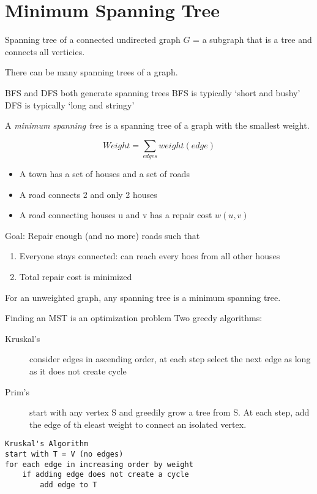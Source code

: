 \documentclass{article}
\begin{document}
\section*{Minimum Spanning Tree}
Spanning tree of a connected undirected graph \(G\) = a subgraph that is a tree
and connects all verticies.

There can be many spanning trees of a graph.

BFS and DFS both generate spanning trees BFS is typically `short and bushy' DFS
is typically `long and stringy'

A \emph{minimum spanning tree} is a spanning tree of a graph with the smallest
weight.

\begin{equation*}
    Weight = \sum_{edges} weight(edge)
\end{equation*}

\begin{itemize}
    \item A town has a set of houses and a set of roads
    \item A road connects 2 and only 2 houses
    \item A road connecting houses u and v has a repair cost \(w(u, v)\)
\end{itemize}

Goal: Repair enough (and no more) roads such that
\begin{enumerate}
    \item Everyone stays connected: can reach every hoes from all other houses
    \item Total repair cost is minimized
\end{enumerate}

For an unweighted graph, any spanning tree is a minimum spanning tree.

Finding an MST is an optimization problem Two greedy algorithms:

\begin{description}
    \item[Kruskal's]  consider edges in ascending order, at each step select the
        next edge as long as it does not create cycle
    \item[Prim's] start with any vertex S and greedily grow a tree from S. At
        each step, add the edge of th eleast weight to connect an isolated vertex.
\end{description}

\begin{verbatim}
Kruskal's Algorithm
start with T = V (no edges)
for each edge in increasing order by weight
    if adding edge does not create a cycle
        add edge to T
\end{verbatim}
\end{document}
